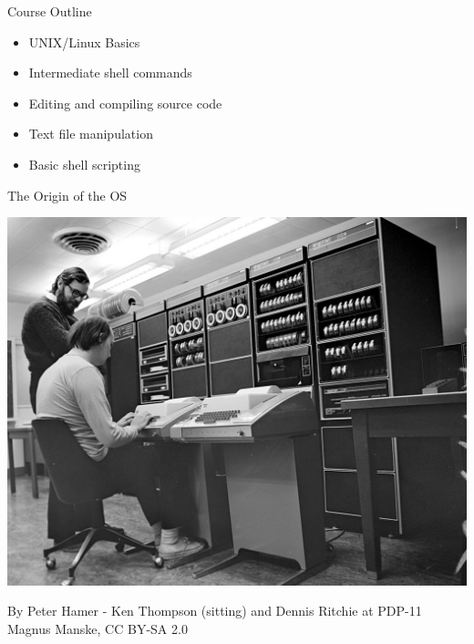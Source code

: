 \documentclass[unknownkeysallowed, 10pt, a4 paper, handout]{beamer}
\begin{document}
\begin{frame}[label=outline]{Course Outline}
  \begin{itemize}
    \item UNIX/Linux Basics
    \item Intermediate shell commands
    \item Editing and compiling source code
    \item Text file manipulation
    \item Basic shell scripting
  \end{itemize}
\end{frame}

\begin{frame}[label=pdp11]{The Origin of the OS}
  \begin{center}
    \includegraphics[scale=3.5]{pics/pdp11.jpg}
  \end{center}
  \begin{flushright}
    \tiny{By Peter Hamer - Ken Thompson (sitting) and Dennis Ritchie at
    PDP-11 Magnus Manske, CC BY-SA 2.0}
  \end{flushright}
\end{frame}
\end{document}
